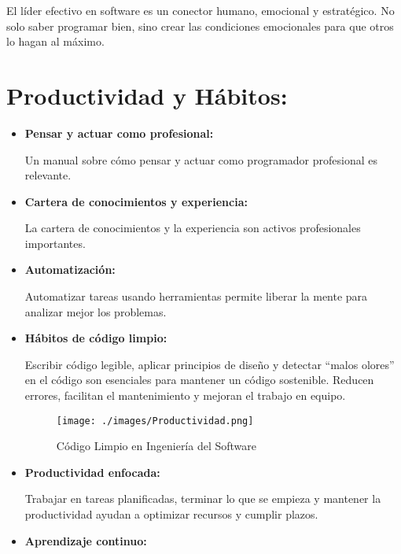 \documentclass[a4paper,12pt,twoside]{article}
\begin{document}
    El líder efectivo en software es un conector humano, emocional y estratégico. No solo saber 
    programar bien, sino crear las condiciones emocionales para que otros lo hagan al máximo.

    

\section{Productividad y Hábitos:}

\begin{itemize}
    \item \textbf{Pensar y actuar como profesional:} 
    
    Un manual sobre cómo pensar y actuar como 
    programador profesional es relevante.
    
    \item \textbf{Cartera de conocimientos y experiencia:} 
    
    La cartera de conocimientos y la 
    experiencia son activos profesionales importantes.
    
    \item \textbf{Automatización:} 
    
    Automatizar tareas usando herramientas permite liberar la 
    mente para analizar mejor los problemas.
    
    \item \textbf{Hábitos de código limpio:} 
    
    Escribir código legible, aplicar principios de diseño y 
    detectar ``malos olores'' en el código son esenciales para mantener un código sostenible. 
    Reducen errores, facilitan el mantenimiento y mejoran el trabajo en equipo.

    \begin{figure}[H]
        \centering
        \texttt{[image: ./images/Productividad.png]}
        \caption{Código Limpio en Ingeniería del Software}
        \label{fig:codigo_limpio}
    \end{figure}
    
    \item \textbf{Productividad enfocada:} 
    
    Trabajar en tareas planificadas, terminar lo que se empieza y mantener la productividad 
    ayudan a optimizar recursos y cumplir plazos.
    
    \item \textbf{Aprendizaje continuo:} 
    

\end{itemize}
\end{document}
